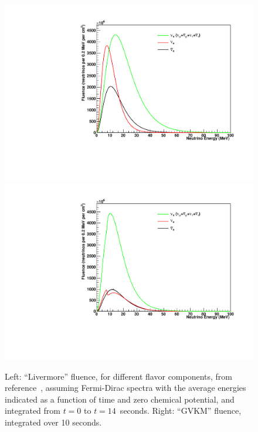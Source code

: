 \documentclass[12pt]{article}
\begin{document}

\begin{figure}
\includegraphics[height=.3\textheight]{flux_livermore.pdf}
\includegraphics[height=.3\textheight]{flux_gvkm.pdf}

\caption{Left: ``Livermore'' fluence, for different flavor components,
  from reference~\cite{Totani:1997vj}, assuming Fermi-Dirac spectra with
  the average energies indicated as a function of time and zero
  chemical potential, and integrated from $t=0$ to $t=14$~seconds.  Right: ``GVKM'' fluence, integrated over 10
  seconds.}\label{fig:fluxes}
\end{figure}
\end{document}

